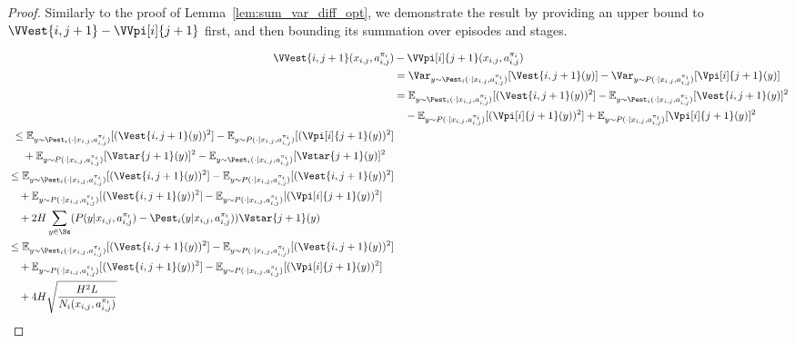 \begin{proof}
Similarly to the proof of Lemma~\ref{lem:sum_var_diff_opt}, we demonstrate the result by providing an upper bound to $\VVest{i,j+1} - \VVpi[i]{j+1}$ first, and then bounding its summation over episodes and stages.

\begin{align}
    \VVest{i,j+1}(x_{i,j}, a_{i,j}^{\pi_i}) &- \VVpi[i]{j+1}(x_{i,j}, a_{i,j}^{\pi_i}) \nonumber \\
    &= \Var_{y \sim \Pest_i (\cdot | x_{i,j}, a_{i,j}^{\pi_i})}[\Vest{i,j+1}(y)] - \Var_{y \sim P (\cdot | x_{i,j}, a_{i,j}^{\pi_i})} [\Vpi[i]{j+1} (y)] \nonumber \\
    &= \mathbb{E}_{y \sim \Pest_i (\cdot | x_{i,j}, a_{i,j}^{\pi_i})} [(\Vest{i,j+1}(y))^2] - \mathbb{E}_{y \sim \Pest_i (\cdot | x_{i,j}, a_{i,j}^{\pi_i})} [\Vest{i,j+1}(y)]^2 \nonumber \\
    &\quad - \mathbb{E}_{y \sim P (\cdot | x_{i,j}, a_{i,j}^{\pi_i})} [(\Vpi[i]{j+1}(y))^2] + \mathbb{E}_{y \sim P (\cdot | x_{i,j}, a_{i,j}^{\pi_i})} [\Vpi[i]{j+1}(y)]^2 \nonumber \\
    \begin{split}
    \label{lem:sum_var_diff_est:1}
    &\le \mathbb{E}_{y \sim \Pest_i (\cdot | x_{i,j}, a_{i,j}^{\pi_i})} [(\Vest{i,j+1}(y))^2] - \mathbb{E}_{y \sim P (\cdot | x_{i,j}, a_{i,j}^{\pi_i})} [(\Vpi[i]{j+1}(y))^2] \\
    &\quad + \mathbb{E}_{y \sim P (\cdot | x_{i,j}, a_{i,j}^{\pi_i})} [\Vstar{j+1}(y)]^2 - \mathbb{E}_{y \sim \Pest_i (\cdot | x_{i,j}, a_{i,j}^{\pi_i})} [\Vstar{j+1}(y)]^2
    \end{split} \\
    \begin{split}
    \label{lem:sum_var_diff_est:2}
    &\le \mathbb{E}_{y \sim \Pest_i (\cdot | x_{i,j}, a_{i,j}^{\pi_i})} [(\Vest{i,j+1}(y))^2] - \mathbb{E}_{y \sim P (\cdot | x_{i,j}, a_{i,j}^{\pi_i})} [(\Vest{i,j+1}(y))^2] \\
    &\quad + \mathbb{E}_{y \sim P (\cdot | x_{i,j}, a_{i,j}^{\pi_i})} [(\Vest{i,j+1}(y))^2] - \mathbb{E}_{y \sim P (\cdot | x_{i,j}, a_{i,j}^{\pi_i})} [(\Vpi[i]{j+1}(y))^2] \\
    &\quad + 2H \sum_{y \in \Ss}(P(y|x_{i,j}, a_{i,j}^{\pi_i}) - \Pest_i (y|x_{i,j}, a_{i,j}^{\pi_i})) \Vstar{j+1}(y)
    \end{split} \\
    \begin{split}
    \label{lem:sum_var_diff_est:3}
    &\le \mathbb{E}_{y \sim \Pest_i (\cdot | x_{i,j}, a_{i,j}^{\pi_i})} [(\Vest{i,j+1}(y))^2] - \mathbb{E}_{y \sim P (\cdot | x_{i,j}, a_{i,j}^{\pi_i})} [(\Vest{i,j+1}(y))^2] \\
    &\quad + \mathbb{E}_{y \sim P (\cdot | x_{i,j}, a_{i,j}^{\pi_i})} [(\Vest{i,j+1}(y))^2] - \mathbb{E}_{y \sim P (\cdot | x_{i,j}, a_{i,j}^{\pi_i})} [(\Vpi[i]{j+1}(y))^2] \\
    &\quad + 4 H \sqrt{\frac{H^2 L}{N_i (x_{i,j}, a_{i,j}^{\pi_i})}} 
    \end{split}
\end{align}


\end{proof}
